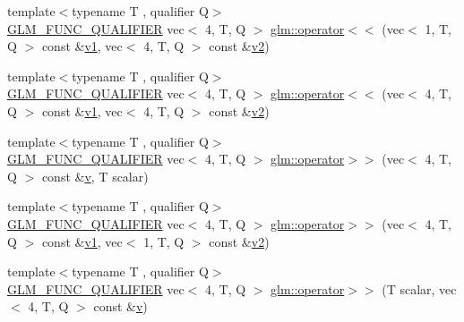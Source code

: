 \begin{DoxyCompactItemize}
\item 
{\footnotesize template$<$typename T , qualifier Q$>$ }\\\mbox{\hyperlink{setup_8hpp_a33fdea6f91c5f834105f7415e2a64407}{G\+L\+M\+\_\+\+F\+U\+N\+C\+\_\+\+Q\+U\+A\+L\+I\+F\+I\+ER}} vec$<$ 4, T, Q $>$ \mbox{\hyperlink{namespaceglm_ae3f5512090c6c8819de19e2ab8bfaaab}{glm\+::operator$<$$<$}} (vec$<$ 1, T, Q $>$ const \&\mbox{\hyperlink{_s_d_l__opengl__glext_8h_a435c176a02c061b43e19bdf7c86cceae}{v1}}, vec$<$ 4, T, Q $>$ const \&\mbox{\hyperlink{_s_d_l__opengl__glext_8h_a0928f6d0f0f794ba000a21dfae422136}{v2}})
\item 
{\footnotesize template$<$typename T , qualifier Q$>$ }\\\mbox{\hyperlink{setup_8hpp_a33fdea6f91c5f834105f7415e2a64407}{G\+L\+M\+\_\+\+F\+U\+N\+C\+\_\+\+Q\+U\+A\+L\+I\+F\+I\+ER}} vec$<$ 4, T, Q $>$ \mbox{\hyperlink{namespaceglm_af94fa09b1d30a8740de6848e9c66bfd5}{glm\+::operator$<$$<$}} (vec$<$ 4, T, Q $>$ const \&\mbox{\hyperlink{_s_d_l__opengl__glext_8h_a435c176a02c061b43e19bdf7c86cceae}{v1}}, vec$<$ 4, T, Q $>$ const \&\mbox{\hyperlink{_s_d_l__opengl__glext_8h_a0928f6d0f0f794ba000a21dfae422136}{v2}})
\item 
{\footnotesize template$<$typename T , qualifier Q$>$ }\\\mbox{\hyperlink{setup_8hpp_a33fdea6f91c5f834105f7415e2a64407}{G\+L\+M\+\_\+\+F\+U\+N\+C\+\_\+\+Q\+U\+A\+L\+I\+F\+I\+ER}} vec$<$ 4, T, Q $>$ \mbox{\hyperlink{namespaceglm_a41728dc5ab8efc32472495941f50bb2c}{glm\+::operator$>$$>$}} (vec$<$ 4, T, Q $>$ const \&\mbox{\hyperlink{_s_d_l__opengl_8h_a10a82eabcb59d2fcd74acee063775f90}{v}}, T scalar)
\item 
{\footnotesize template$<$typename T , qualifier Q$>$ }\\\mbox{\hyperlink{setup_8hpp_a33fdea6f91c5f834105f7415e2a64407}{G\+L\+M\+\_\+\+F\+U\+N\+C\+\_\+\+Q\+U\+A\+L\+I\+F\+I\+ER}} vec$<$ 4, T, Q $>$ \mbox{\hyperlink{namespaceglm_a0f2a5dda8264e8b59bcc8cd6b2488d8d}{glm\+::operator$>$$>$}} (vec$<$ 4, T, Q $>$ const \&\mbox{\hyperlink{_s_d_l__opengl__glext_8h_a435c176a02c061b43e19bdf7c86cceae}{v1}}, vec$<$ 1, T, Q $>$ const \&\mbox{\hyperlink{_s_d_l__opengl__glext_8h_a0928f6d0f0f794ba000a21dfae422136}{v2}})
\item 
{\footnotesize template$<$typename T , qualifier Q$>$ }\\\mbox{\hyperlink{setup_8hpp_a33fdea6f91c5f834105f7415e2a64407}{G\+L\+M\+\_\+\+F\+U\+N\+C\+\_\+\+Q\+U\+A\+L\+I\+F\+I\+ER}} vec$<$ 4, T, Q $>$ \mbox{\hyperlink{namespaceglm_a290be3754265f139a5660f93944c90ce}{glm\+::operator$>$$>$}} (T scalar, vec$<$ 4, T, Q $>$ const \&\mbox{\hyperlink{_s_d_l__opengl_8h_a10a82eabcb59d2fcd74acee063775f90}{v}})

\end{DoxyCompactItemize}
